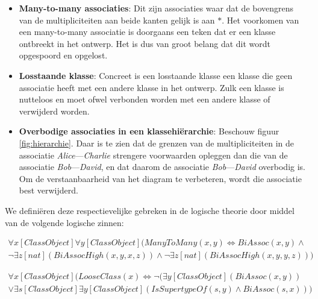 \begin{itemize}
	\item \textbf{Many-to-many associaties}: Dit zijn associaties waar dat de bovengrens van de multipliciteiten aan beide kanten gelijk is aan $*$. Het voorkomen van een many-to-many associatie is doorgaans een teken dat er een klasse ontbreekt in het ontwerp. Het is dus van groot belang dat dit wordt opgespoord en opgelost.
	
	\item \textbf{Losstaande klasse}: Concreet is een losstaande klasse een klasse die geen associatie heeft met een andere klasse in het ontwerp. Zulk een klasse is nutteloos en moet ofwel verbonden worden met een andere klasse of verwijderd worden.
	
	\item \textbf{Overbodige associaties in een klassehi\"erarchie}: Beschouw figuur \ref{fig:hierarchie}. Daar is te zien dat de grenzen van de multipliciteiten in de associatie \textit{Alice}---\textit{Charlie} strengere voorwaarden opleggen dan die van de associatie \textit{Bob}---\textit{David}, en dat daarom de associatie \textit{Bob}---\textit{David} overbodig is. Om de verstaanbaarheid van het diagram te verbeteren, wordt die associatie best verwijderd.
\end{itemize}

We defini\"eren deze respectievelijke gebreken in de logische theorie door middel van de volgende logische zinnen:

\begin{align*}
	\forall{x}[ClassObject]\forall{y}[ClassObject](ManyToMany(x,y) \Leftrightarrow BiAssoc(x,y) \land \\ \lnot\exists{z}[nat](BiAssocHigh(x,y,x,z)) \land \lnot\exists{z}[nat](BiAssocHigh(x,y,y,z)))
\end{align*}

\begin{align*}
	\forall{x}[ClassObject](LooseClass(x) \Leftrightarrow \lnot(\exists{y}[ClassObject](BiAssoc(x,y)) \\ \lor \exists{s}[ClassObject]\exists{y}[ClassObject](IsSupertypeOf(s,y) \land BiAssoc(s,x)))
\end{align*}


